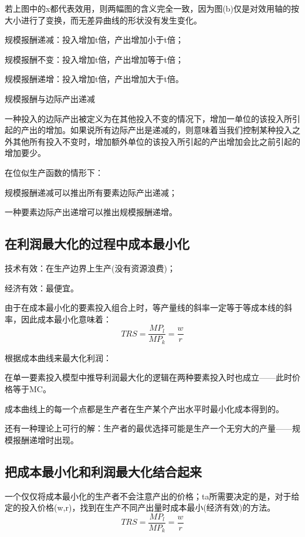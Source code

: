 \documentclass{article}
\begin{document}
若上图中的x都代表效用，则两幅图的含义完全一致，因为图(b)仅是对效用轴的按大小进行了变换，而无差异曲线的形状没有发生变化。

规模报酬递减：投入增加t倍，产出增加小于t倍；

规模报酬不变：投入增加t倍，产出增加等于t倍；

规模报酬递增：投入增加t倍，产出增加大于t倍。

\hspace*{\fill}

规模报酬与边际产出递减

一种投入的边际产出被定义为在其他投入不变的情况下，增加一单位的该投入所引起的产出的增加。如果说所有边际产出是递减的，则意味着当我们控制某种投入之外其他所有投入不变时，增加额外单位的该投入所引起的产出增加会比之前引起的增加要少。

\hspace*{\fill}

在位似生产函数的情形下：

规模报酬递减可以推出所有要素边际产出递减；

一种要素边际产出递增可以推出规模报酬递增。

\subsection{在利润最大化的过程中成本最小化}

技术有效：在生产边界上生产(没有资源浪费)；

经济有效：最便宜。

由于在成本最小化的要素投入组合上时，等产量线的斜率一定等于等成本线的斜率，因此成本最小化意味着：
\[
TRS=\frac{MP_l}{MP_k}=\frac{w}{r}
\]

根据成本曲线来最大化利润：

在单一要素投入模型中推导利润最大化的逻辑在两种要素投入时也成立——此时价格等于MC。

成本曲线上的每一个点都是生产者在生产某个产出水平时最小化成本得到的。

还有一种理论上可行的解：生产者的最优选择可能是生产一个无穷大的产量——规模报酬递增时出现。

\subsection{把成本最小化和利润最大化结合起来}

一个仅仅将成本最小化的生产者不会注意产出的价格；ta所需要决定的是，对于给定的投入价格(w,r)，找到在生产不同产出量时成本最小(经济有效)的方法。
\[
TRS=\frac{MP_l}{MP_k}=\frac{w}{r}
\]
\end{document}
